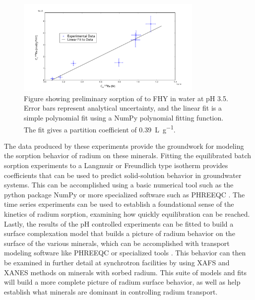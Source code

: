 \documentclass[twoside,12pt,titlepage]{article}
\newcommand{\isotope}[2]{\ch{^{#1}#2}}
\begin{document}
\begin{figure}
	\centering
	\includegraphics[width=0.8\textwidth]{AGU2014FHYRa.pdf}
	\caption{Figure showing preliminary sorption of \isotope{226}{Ra} to FHY in water at pH \num{3.5}. Error bars represent analytical uncertainty, and the linear fit is a simple polynomial fit using a NumPy polynomial fitting function. The fit gives a partition coefficient of \SI{0.39}{\liter\per\gram}.}
	\label{fig:RaFHYSorb}
\end{figure}

\par The data produced by these experiments provide the groundwork for modeling the sorption behavior of radium on these minerals. Fitting the equilibrated batch sorption experiments to a Langmuir or Freundlich type isotherm provides coefficients that can be used to predict solid-solution behavior in groundwater systems. This can be accomplished using a basic numerical tool such as the python package NumPy or more specialized software such as PHREEQC \cite{PHREEQC}. The time series experiments can be used to establish a foundational sense of the kinetics of radium sorption, examining how quickly equilibration can be reached. Lastly, the results of the pH controlled experiments can be fitted to build a surface complexation model that builds a picture of radium behavior on the surface of the various minerals, which can be accomplished with transport modeling software like PHREEQC or specialized tools \cite{Dixit2003}. This behavior can then be examined in further detail at synchrotron facilities by using XAFS and XANES methods on minerals with sorbed radium. This suite of models and fits will build a more complete picture of radium surface behavior, as well as help establish what minerals are dominant in controlling radium transport.
\end{document}
